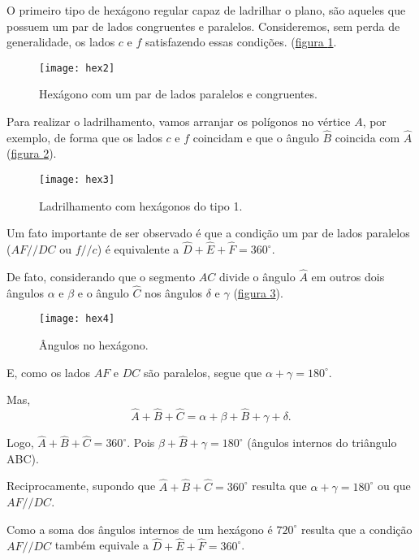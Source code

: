 O primeiro tipo de hexágono regular capaz de ladrilhar o plano, são aqueles que possuem um par de lados congruentes e paralelos. Consideremos, sem perda de generalidade, os lados $c$ e $f$ satisfazendo essas condições.  (\hyperref[hex2]{figura \ref{hex2}}.

\begin{figure}[H]
\centering
\texttt{[image: hex2]}
\caption{Hexágono com um par de lados paralelos e congruentes.}
\label{hex2}
\end{figure}

 
Para realizar o ladrilhamento, vamos arranjar os polígonos no vértice $A$, por exemplo, de forma que os lados $c$ e $f$ coincidam e que o ângulo $\hat{B}$ coincida com $\hat{A}$ (\hyperref[hex3]{figura \ref{hex3}}).

\begin{figure}[H]
\centering
\texttt{[image: hex3]}
\caption{Ladrilhamento com hexágonos do tipo 1.}
\label{hex3}
\end{figure}

Um fato importante de ser observado é que a condição um par de lados paralelos ($AF//DC$ ou $f//c$)  é equivalente a $\hat{D} + \hat{E} + \hat{F} = 360^{\circ}$.

De fato,  considerando que o segmento $AC$ divide o ângulo $\hat{A}$ em outros dois ângulos $\alpha$ e $\beta$ e o ângulo $\hat{C}$ nos ângulos $\delta$ e $\gamma$ (\hyperref[hex4]{figura \ref{hex4}}).


\begin{figure}[H]
\centering
\texttt{[image: hex4]}
\caption{Ângulos no hexágono.}
\label{hex4}
\end{figure}

E, como os lados $AF$ e $DC$ são paralelos, segue que $\alpha +\gamma = 180^{\circ}$.

Mas, $$\hat{A} + \hat{B} + \hat{C} = \alpha + \beta + \hat{B} + \gamma + \delta.$$

Logo, $\hat{A} + \hat{B} + \hat{C} = 360^{\circ}$. Pois  $\beta + \hat{B} + \gamma = 180^{\circ}$ (ângulos internos do triângulo ABC).

Reciprocamente, supondo que $\hat{A} + \hat{B} + \hat{C} = 360^{\circ}$ resulta que  $\alpha +\gamma = 180^{\circ}$ ou que $AF//DC$.

Como a soma dos ângulos internos de um hexágono é $720^{\circ}$ resulta que a condição $AF//DC$ também equivale a $\hat{D} + \hat{E} + \hat{F} = 360^{\circ}$.



